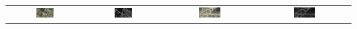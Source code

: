 \documentclass[12pt,a4paper]{article}
\begin{document}
\begin{tabular}{ c c c c}
 \includegraphics[width=0.25\textwidth]{./pictures/fimg8.png} & \includegraphics[width=0.25\textwidth]{./pictures/fimg8.png_final_img.jpg} & \includegraphics[width=0.25\textwidth]{./pictures/fimg12.png} & \includegraphics[width=0.25\textwidth]{./pictures/fimg12.png_final_img.jpg}\\

\end{tabular}
\end{document}
